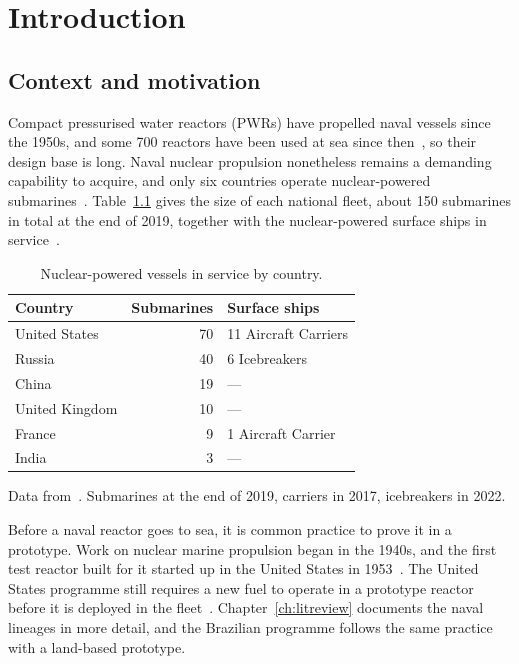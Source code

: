 \providecommand{\openpoint}[1]{\par\noindent\fbox{\parbox{0.97\linewidth}{%
  \textbf{Open point:} #1}}\par}

\chapter{Introduction}
\label{ch:introduction}

\section{Context and motivation}
\label{sec:intro-context}

Compact pressurised water reactors (PWRs) have propelled naval vessels
since the 1950s, and some 700 reactors have been used at sea since
then~\cite{wna_ships}, so their design base is long. Naval nuclear
propulsion nonetheless remains a demanding capability to acquire, and
only six countries operate nuclear-powered submarines~\cite{wna_ships}.
Table~\ref{tab:intro-submarines} gives the size of each national fleet, 
about 150 submarines in total at the end of 2019, together with the nuclear-powered surface ships in service~\cite{wna_ships}.

\begin{table}[!htbp]
  \centering
  \caption{Nuclear-powered vessels in service by country.}
  \label{tab:intro-submarines}
  \small
  \begin{tabular}{@{}lrl@{}}
    \toprule
    Country & Submarines & Surface ships \\
    \midrule
    United States  & 70 & 11 Aircraft Carriers \\
    Russia         & 40 & 6 Icebreakers \\
    China          & 19 & --- \\
    United Kingdom & 10 & --- \\
    France         & 9  & 1 Aircraft Carrier \\
    India          & 3  & --- \\
    \bottomrule
  \end{tabular}
  \vspace{2pt}
  
  {\footnotesize Data from~\cite{wna_ships}. Submarines at the end of 2019,
  carriers in 2017, icebreakers in 2022.}
\end{table}
\FloatBarrier

Before a naval reactor goes to sea, it is common practice to prove it in
a prototype. Work on nuclear marine propulsion began in the 1940s, and
the first test reactor built for it started up in the United States in
1953~\cite{wna_ships}. The United States programme
still requires a new fuel to operate in a prototype reactor before it is
deployed in the fleet~\cite{jason_2016}. Chapter~\ref{ch:litreview}
documents the naval lineages in more detail, and the Brazilian programme
follows the same practice with a land-based prototype.


